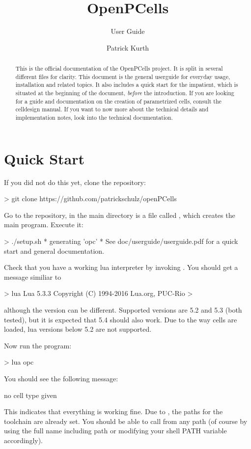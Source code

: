 

\title{OpenPCells}
\subtitle{User Guide}
\author{Patrick Kurth}



\maketitle
\begin{abstract}
    \noindent This is the official documentation of the OpenPCells project.  It is split in several different files for clarity. 
    This document is the general userguide for everyday usage, installation and related topics. It also includes a quick start for the impatient, which is situated
    at the beginning of the document, \emph{before} the introduction.
    If you are looking for a guide and documentation on the creation of parametrized cells, consult the celldesign manual.
    If you want to now more about the technical details and implementation notes, look into the technical documentation.
\end{abstract}

\tableofcontents

\section{Quick Start}
If you did not do this yet, clone the repository:
\begin{shellcode}
    > git clone https://github.com/patrickschulz/openPCells
\end{shellcode}
Go to the repository, in the main directory is a file called , which creates the main program. Execute it:
\begin{shellcode}
    > ./setup.sh
    * generating 'opc' *
    See doc/userguide/userguide.pdf for a quick start and general documentation.
\end{shellcode}

Check that you have a working lua interpreter by invoking . You should get a message similiar to
\begin{shellcode}
    > lua 
    Lua 5.3.3  Copyright (C) 1994-2016 Lua.org, PUC-Rio
    > 
\end{shellcode}
although the version can be different. Supported versions are 5.2 and 5.3 (both tested), but it is expected that 5.4 should also work. Due to the way cells are
loaded, lua versions below 5.2 are not supported.

Now run the program:
\begin{shellcode}
    > lua opc
\end{shellcode}
You should see the following message:
\begin{shellcode}
    no cell type given
\end{shellcode}
This indicates that everything is working fine. Due to , the paths for the toolchain are already set. You should be able to call
 from any path (of course by using the full name including path or modifying your shell PATH variable accordingly).

